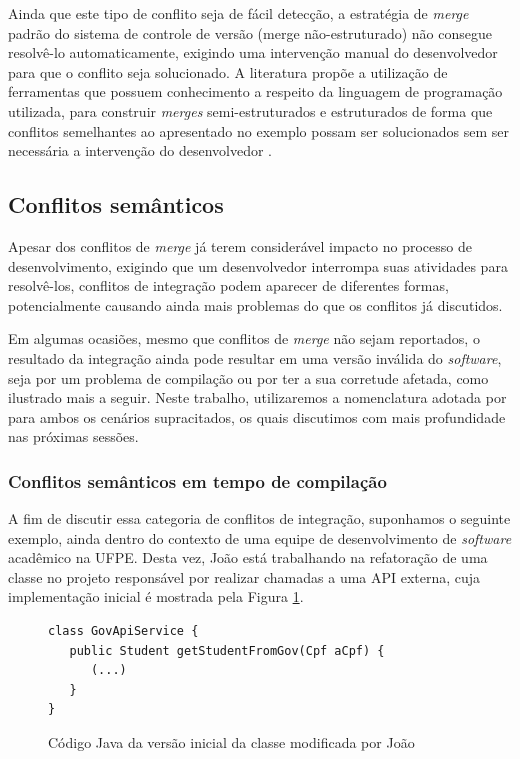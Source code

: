 \documentclass[12pt]{article}
\begin{document}
Ainda que este tipo de conflito seja de fácil detecção, a estratégia de \textit{merge} padrão do sistema de controle de versão (merge não-estruturado) não consegue resolvê-lo automaticamente, exigindo uma intervenção manual do desenvolvedor para que o conflito seja solucionado. A literatura propõe a utilização de ferramentas que possuem conhecimento a respeito da linguagem de programação utilizada, para construir \textit{merges} semi-estruturados e estruturados de forma que conflitos semelhantes ao apresentado no exemplo possam ser solucionados sem ser necessária a intervenção do desenvolvedor \cite{cavalcanti:2021}.

\subsection{Conflitos semânticos}
Apesar dos conflitos de \textit{merge} já terem considerável impacto no processo de desenvolvimento, exigindo que um desenvolvedor interrompa suas atividades para resolvê-los, conflitos de integração podem aparecer de diferentes formas, potencialmente causando ainda mais problemas do que os conflitos já discutidos.

Em algumas ocasiões, mesmo que conflitos de \textit{merge} não sejam reportados, o resultado da integração ainda pode resultar em uma versão inválida do \textit{software}, seja por um problema de compilação ou por ter a sua corretude afetada, como ilustrado mais a seguir. Neste trabalho, utilizaremos a nomenclatura adotada por \cite{leuson:tese} para ambos os cenários supracitados, os quais discutimos com mais profundidade nas próximas sessões.

\subsubsection{Conflitos semânticos em tempo de compilação}
A fim de discutir essa categoria de conflitos de integração, suponhamos o seguinte exemplo, ainda dentro do contexto de uma equipe de desenvolvimento de \textit{software} acadêmico na UFPE. Desta vez, João está trabalhando na refatoração de uma classe no projeto responsável por realizar chamadas a uma API externa, cuja implementação inicial é mostrada pela Figura \ref{fig:build1}.

\begin{figure}[H]
\begin{verbatim}
class GovApiService {
   public Student getStudentFromGov(Cpf aCpf) {
      (...)
   }
}
\end{verbatim}
    \caption{Código Java da versão inicial da classe modificada por João}
    \label{fig:build1}
\end{figure}
\end{document}
